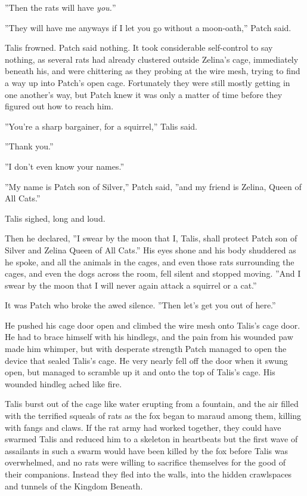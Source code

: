 \documentclass[11pt]{article}
\begin{document}
 ''Then the rats will have {\it you.}''\par
 ''They will have me anyways if I let you go without a moon-oath,'' Patch said.\par
 Talis frowned. Patch said nothing. It took considerable self-control to say nothing, as several rats had already clustered outside Zelina's cage, immediately beneath his, and were chittering as they probing at the wire mesh, trying to find a way up into Patch's open cage. Fortunately they were still mostly getting in one another's way, but Patch knew it was only a matter of time before they figured out how to reach him.\par
 ''You're a sharp bargainer, for a squirrel,'' Talis said.\par
 ''Thank you.''\par
''I don't even know your names.''\par
 ''My name is Patch son of Silver,'' Patch said, ''and my friend is Zelina, Queen of All Cats.''\par
 Talis sighed, long and loud.\par
Then he declared, ''I swear by the moon that I, Talis, shall protect Patch son of Silver and Zelina Queen of All Cats.'' His eyes shone and his body shuddered as he spoke, and all the animals in the cages, and even those rats surrounding the cages, and even the dogs across the room, fell silent and stopped moving. ''And I swear by the moon that I will never again attack a squirrel or a cat.''\par
 It was Patch who broke the awed silence. ''Then let's get you out of here.''\par
 He pushed his cage door open and climbed the wire mesh onto Talis's cage door. He had to brace himself with his hindlegs, and the pain from his wounded paw made him whimper, but with desperate strength Patch managed to open the device that sealed Talis's cage. He very nearly fell off the door when it swung open, but managed to scramble up it and onto the top of Talis's cage. His wounded hindleg ached like fire.\par
 Talis burst out of the cage like water erupting from a fountain, and the air filled with the terrified squeals of rats as the fox began to maraud among them, killing with fangs and claws. If the rat army had worked together, they could have swarmed Talis and reduced him to a skeleton in heartbeats %
 but the first wave of assailants in such a swarm would have been killed by the fox before Talis was overwhelmed, and no rats were willing to sacrifice themselves for the good of their companions. Instead they fled into the walls, into the hidden crawlspaces and tunnels of the Kingdom Beneath.\par
\end{document}
